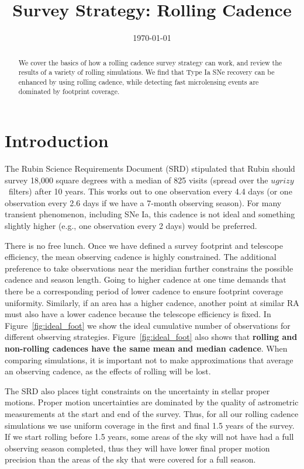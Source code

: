 \documentclass[modern]{aastex62}
\begin{document}

\date{\today}
\title{Survey Strategy: Rolling Cadence}

\begin{abstract}
We cover the basics of how a rolling cadence survey strategy can work, and review the results of a variety of rolling simulations. We find that Type Ia SNe recovery can be enhanced by using rolling cadence, while detecting fast microlensing events are dominated by footprint coverage.
\end{abstract}

\section{Introduction}

The Rubin Science Requirements Document (SRD) stipulated that Rubin should survey 18,000 square degrees with a median of 825 visits (spread over the $ugrizy$\ filters) after 10 years. This works out to one observation every 4.4 days (or one observation every 2.6 days if we have a 7-month observing season). For many transient phenomenon, including SNe Ia, this cadence is not ideal and something slightly higher (e.g., one observation every 2 days) would be preferred. 

There is no free lunch. Once we have defined a survey footprint and telescope efficiency, the mean observing cadence is highly constrained. The additional preference to take observations near the meridian further constrains the possible cadence and season length. Going to higher cadence at one time demands that there be a corresponding period of lower cadence to ensure footprint coverage uniformity. Similarly, if an area has a higher cadence, another point at similar RA must also have a lower cadence because the telescope efficiency is fixed.  In Figure~\ref{fig:ideal_foot} we show the ideal cumulative number of observations for different observing strategies. Figure~\ref{fig:ideal_foot} also shows that {\bf{rolling and non-rolling cadences have the same mean and median cadence}}. When comparing simulations, it is important not to make approximations that average an observing cadence, as the effects of rolling will be lost.

The SRD also places tight constraints on the uncertainty in stellar proper motions. Proper motion uncertainties are dominated by the quality of astrometric measurements at the start and end of the survey. Thus, for all our rolling cadence simulations we use uniform coverage in the first and final 1.5 years of the survey. If we start rolling before 1.5 years, some areas of the sky will not have had a full observing season completed, thus they will have lower final proper motion precision than the areas of the sky that were covered for a full season.
\end{document}
